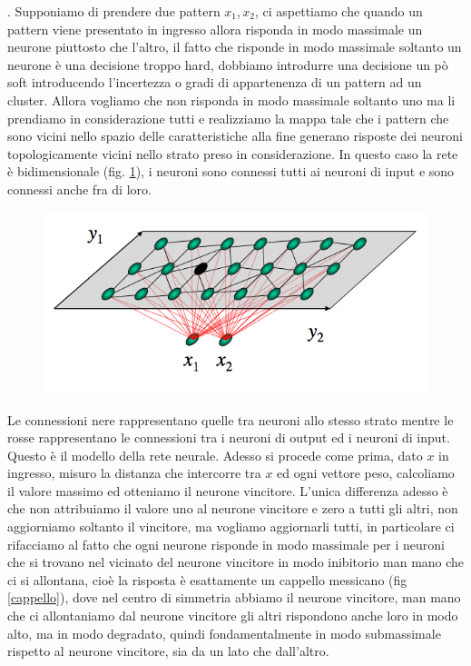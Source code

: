 \noindent . Supponiamo di prendere due pattern $x_1, x_2$, ci aspettiamo che quando un pattern viene presentato in ingresso allora risponda in modo massimale un neurone piuttosto che l'altro, il fatto che risponde in modo massimale soltanto un neurone è una decisione troppo hard, dobbiamo introdurre una decisione un pò soft introducendo l'incertezza o gradi di appartenenza di un pattern ad un cluster.  Allora vogliamo che non risponda in modo massimale soltanto uno ma li prendiamo in considerazione tutti e realizziamo la mappa tale che i pattern che sono vicini nello spazio delle caratteristiche alla fine generano risposte dei neuroni topologicamente vicini nello strato preso in considerazione.  
In questo caso la rete è bidimensionale (fig. \ref{retebd}), i neuroni sono connessi tutti ai neuroni di input e sono connessi anche fra di loro.
\begin{figure}
\centering
\includegraphics[scale=0.5]{img/retebd.png}
\caption{}
\label{retebd}
\end{figure}
Le connessioni nere rappresentano quelle tra neuroni allo stesso strato mentre le rosse rappresentano le connessioni tra i neuroni di output ed i neuroni di input.  Questo è il modello della rete neurale. Adesso si procede come prima, dato $x$ in ingresso, misuro la distanza che intercorre tra $x$ ed ogni vettore peso, calcoliamo il valore massimo ed otteniamo il neurone vincitore. L'unica differenza adesso è che non attribuiamo il valore uno al neurone vincitore e zero a tutti gli altri, non aggiorniamo soltanto il vincitore, ma vogliamo aggiornarli tutti, in particolare ci rifacciamo al fatto che ogni neurone risponde in modo massimale per i neuroni che si trovano nel vicinato del neurone vincitore in modo inibitorio man mano che ci si allontana, cioè la risposta è esattamente un cappello messicano (fig \ref{cappello}), dove nel centro di simmetria abbiamo il neurone vincitore, man mano che ci allontaniamo dal neurone vincitore gli altri rispondono anche loro in modo alto, ma in modo degradato, quindi fondamentalmente in modo submassimale rispetto al neurone vincitore, sia da un lato che dall'altro. 
